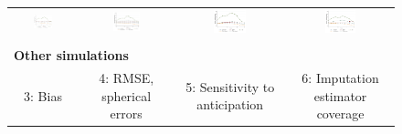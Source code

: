 \documentclass[english,11pt]{article}
\providecommand{\tabularnewline}{\\}
\theoremstyle{plain}
\theoremstyle{plain}
\theoremstyle{plain}
\theoremstyle{plain}
\begin{document}
\begin{landscape}
\begin{figure}
\begin{centering}
\begin{tabular}{cccc}
\includegraphics[width=0.32\textwidth]{Graphs/FigureA2_2_homo} & \includegraphics[width=0.32\textwidth]{Graphs/FigureA2_2_hetero} & \includegraphics[width=0.32\textwidth]{Graphs/FigureA2_2_ar1} & \includegraphics[width=0.32\textwidth]{Graphs/FigureA2_2_wild}\tabularnewline
 &  &  & \tabularnewline
\multicolumn{3}{l}{\textbf{\small{}Other simulations}} & \tabularnewline
\multirow{1}{*}{{\small{}3: Bias}} & {\small{}4: RMSE, spherical errors} & \multirow{1}{*}{{\small{}5: Sensitivity to anticipation}} & \multirow{1}{*}{{\small{}6: Imputation estimator coverage}}\tabularnewline

\end{tabular}
\end{centering}
\end{figure}
\end{landscape}
\end{document}
